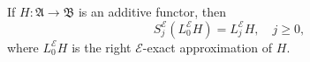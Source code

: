 If $H : \mathfrak{A} \to \mathfrak{B}$ is an additive functor, then
$$S_j^{\mathcal{E}}(L_0^{\mathcal{E}} H) = L_j^{\mathcal{E}} H, \quad j \ge 0,$$
where $L_0^{\mathcal{E}} H$ is the right $\mathcal{E}$-exact approximation of $H$.
